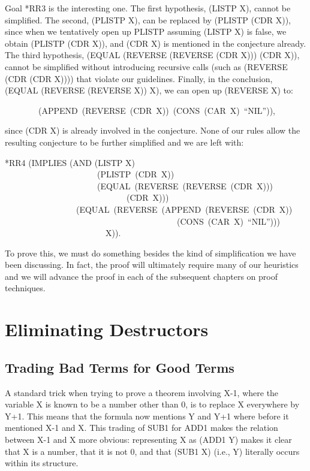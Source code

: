 \documentclass[10pt]{book}
\newenvironment{pubasis}{\begin{flushleft}}{\end{flushleft}}
\begin{document}
Goal *RR3 is the interesting one.  The first hypothesis, (LISTP X), cannot
be simplified.  The second, (PLISTP X), can be replaced by (PLISTP (CDR X)),
since when we tentatively open up PLISTP assuming (LISTP X) is false, we
obtain (PLISTP (CDR X)), and (CDR X) is mentioned in the conjecture already.
The third hypothesis, (EQUAL (REVERSE (REVERSE (CDR X))) (CDR X)), cannot be simplified
without introducing recursive calls (such as (REVERSE (CDR (CDR X)))) that
violate our guidelines.  Finally, in the conclusion, (EQUAL (REVERSE (REVERSE X))  X),
we can open up (REVERSE X) to:
\begin{pubasis}
~~~~~~~~(APPEND~(REVERSE~(CDR~X))~(CONS~(CAR~X)~``NIL'')),\\
\end{pubasis}
since (CDR X) is already involved in the conjecture.   None of our rules allow the resulting conjecture to be further
simplified and we are left with:
\begin{pubasis}
*RR4	(IMPLIES (AND (LISTP X)\\
~~~~~~~~~~~~~~~~~~~~~~(PLISTP~(CDR~X))\\
~~~~~~~~~~~~~~~~~~~~~~(EQUAL~(REVERSE~(REVERSE~(CDR~X)))\\
~~~~~~~~~~~~~~~~~~~~~~~~~~~~~(CDR~X)))\\
~~~~~~~~~~~~~~~~~(EQUAL~(REVERSE~(APPEND~(REVERSE~(CDR~X))\\
~~~~~~~~~~~~~~~~~~~~~~~~~~~~~~~~~~~~~~~~~(CONS~(CAR~X)~``NIL'')))\\
~~~~~~~~~~~~~~~~~~~~~~~~X)).\\
\end{pubasis}
To prove this, we must do something besides the kind of simplification we
have been discussing.  In fact, the proof will ultimately require many of our heuristics
and we will advance the proof in each of the subsequent chapters
on proof techniques.

\chapter{Eliminating Destructors}
\pagestyle{headings}
\label{SECELIMINATINGDESTRUCTORS}
\section{Trading Bad Terms for Good Terms}
A standard trick when trying to prove a theorem involving
X-1, where the variable X is known to be a number other than 0,
is to replace   X everywhere  by Y+1.  This means that the formula
now mentions Y and Y+1 where before it mentioned X-1 and X.
This trading of SUB1 for ADD1 makes
the relation between X-1 and X more obvious:
representing X as (ADD1 Y) makes it clear that X is a number,
that it is not 0, and that (SUB1 X) (i.e., Y) literally occurs within its
structure.
\end{document}
